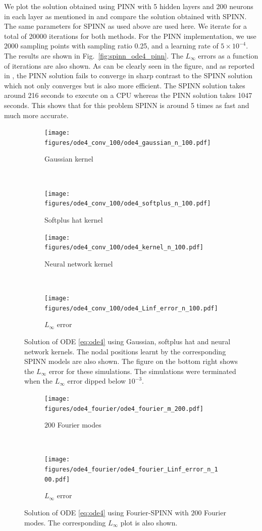 \documentclass[12pt]{article}
\begin{document}
{We plot the solution obtained using PINN with 5 hidden layers and 200 neurons in each layer as mentioned in \cite{WANG2021113938} and compare the solution obtained with SPINN. The same parameters for SPINN as used above are used here.  We iterate for a total of 20000 iterations for both methods.  For the PINN implementation, we use 2000 sampling points with sampling ratio 0.25, and a learning rate of $5\times 10^{-4}$. The results are shown in Fig.~\ref{fig:spinn_ode4_pinn}.  The $L_{\infty}$ errors as a function of iterations are also shown.  As can be clearly seen in the figure, and as reported in \cite{WANG2021113938}, the PINN solution fails to converge in sharp contrast to the SPINN solution which not only converges but is also more efficient.  The SPINN solution takes around 216 seconds to execute on a CPU whereas the PINN solution takes 1047 seconds.  This shows that for this problem SPINN is around 5 times as fast and much more accurate.

\begin{figure}
\begin{subfigure}{0.5\textwidth}
\texttt{[image: figures/ode4\_conv\_100/ode4\_gaussian\_n\_100.pdf]}
\caption{Gaussian kernel}
\label{ode4_gaussian}
\end{subfigure}
~
\begin{subfigure}{0.5\textwidth}
\texttt{[image: figures/ode4\_conv\_100/ode4\_softplus\_n\_100.pdf]}
\caption{Softplus hat kernel}
\label{ode4_softplus}
\end{subfigure}
\begin{subfigure}{0.5\textwidth}
\texttt{[image: figures/ode4\_conv\_100/ode4\_kernel\_n\_100.pdf]}
\caption{Neural network kernel}
\label{ode4_nn_kernel}
\end{subfigure}
~
\begin{subfigure}{0.5\textwidth}
\texttt{[image: figures/ode4\_conv\_100/ode4\_Linf\_error\_n\_100.pdf]}
\caption{$L_\infty$ error}
\label{ode4_Linf}
\end{subfigure}
\caption{Solution of ODE \eqref{eq:ode4} using Gaussian, softplus hat and neural network kernels. The nodal positions learnt by the corresponding SPINN models are also shown. The figure on the bottom right shows the $L_\infty$ error for these simulations. The simulations were terminated when the $L_\infty$ error dipped below $10^{-3}$.}
\label{fig:spinn_ode4}
\end{figure}

\begin{figure}
\begin{subfigure}{0.5\textwidth}
\texttt{[image: figures/ode4\_fourier/ode4\_fourier\_m\_200.pdf]}
\caption{$200$ Fourier modes}
\label{ode4_fourier_200}
\end{subfigure}
~
\begin{subfigure}{0.5\textwidth}
\texttt{[image: figures/ode4\_fourier/ode4\_fourier\_Linf\_error\_n\_100.pdf]}
\caption{$L_\infty$ error}
\label{ode4_fourier_Linf}
\end{subfigure}
\caption{Solution of ODE \eqref{eq:ode4} using Fourier-SPINN with $200$ Fourier modes. The corresponding $L_\infty$ plot is also shown.}
\label{fig:spinn_ode4_fourier}
\end{figure}
}
\end{document}
